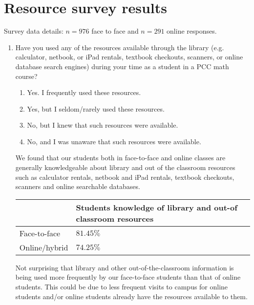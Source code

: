 \chapter{Resource survey results}\label{app:sec:resourcesurvey}
Survey data details: $n=976$ face to face and $n=291$ online responses.

\begin{enumerate}
	\item Have you used any of the resources available through the library (e.g. calculator, netbook, or iPad rentals, textbook checkouts, scanners, or online database search engines) during your time as a student in a PCC math course?
	\begin{enumerate}
		\item     Yes. I frequently used these resources.
		\item    Yes, but I seldom/rarely used these resources.
		\item     No, but I knew that such resources were available.
		\item     No, and I was unaware that such resources were available.
	\end{enumerate}
	We found that our students both in face-to-face and online classes are generally knowledgeable about library and out of the classroom resources such as calculator rentals, netbook and iPad rentals, textbook checkouts, scanners and online searchable databases.
		
    \begin{tabularx}{\linewidth}{lY}
		\toprule
		              & Students knowledge of library and out-of classroom resources \\
		\midrule
		Face-to-face  & $81.45\%$                                                   \\
		Online/hybrid & $74.25\%$                                                   \\
		\bottomrule
	\end{tabularx}
	
	Not surprising that library and other out-of-the-classroom information is being used more frequently by our face-to-face students than that of online students. This could be due to less frequent visits to campus for online students and/or online students already have the resources available to them. 
	

\end{enumerate}
